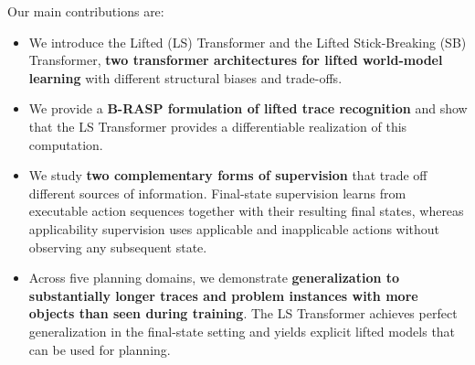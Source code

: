 {Our main contributions are:
\begin{itemize}
\item We introduce the Lifted \strips (LS) Transformer and the Lifted Stick-Breaking (SB) Transformer, \textbf{two transformer architectures for lifted world-model learning} with different structural biases and trade-offs.
\item We provide a \textbf{B-RASP formulation of lifted \strips trace recognition} and show that the LS Transformer provides a differentiable realization of this computation.
\item We study \textbf{two complementary forms of supervision} that trade off different sources of information. Final-state supervision learns from executable action sequences together with their resulting final states, whereas applicability supervision uses applicable and inapplicable actions without observing any subsequent state.
\item Across five planning domains, we demonstrate \textbf{generalization to substantially longer traces and problem instances with more objects than seen during training}. The LS Transformer achieves perfect generalization in the final-state setting and yields explicit lifted models that can be used for planning.
\end{itemize}





}
